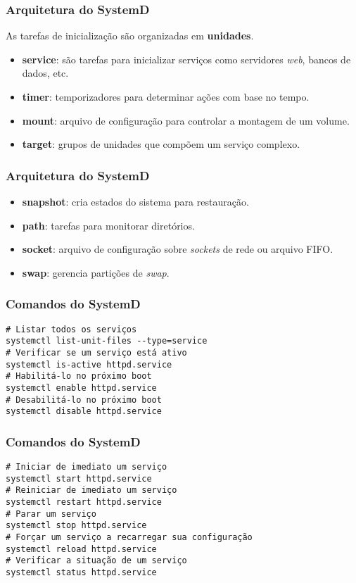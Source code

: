 \documentclass{beamer}
\begin{document}
   \begin{frame}
      \frametitle{Arquitetura do SystemD}
      As tarefas de inicialização são organizadas em \textbf{unidades}.
      \begin{itemize}
         \item \textbf{service}: são tarefas para inicializar serviços como servidores \textit{web}, bancos de dados, etc.	      
         \item \textbf{timer}: temporizadores para determinar ações com base no tempo.
         \item \textbf{mount}: arquivo de configuração para controlar a montagem de um volume.
         \item \textbf{target}: grupos de unidades que compõem um serviço complexo.
      \end{itemize}
   \end{frame}

   \begin{frame}
      \frametitle{Arquitetura do SystemD}
      \begin{itemize}
         \item \textbf{snapshot}: cria estados do sistema para restauração.	      
         \item \textbf{path}: tarefas para monitorar diretórios.
	 \item \textbf{socket}: arquivo de configuração sobre \textit{sockets} de rede ou arquivo FIFO.
	 \item \textbf{swap}: gerencia partições de \textit{swap}.
      \end{itemize}
   \end{frame}

   \begin{frame}[fragile]
      \frametitle{Comandos do SystemD}
      \begin{verbatim}
# Listar todos os serviços
systemctl list-unit-files --type=service
# Verificar se um serviço está ativo
systemctl is-active httpd.service
# Habilitá-lo no próximo boot
systemctl enable httpd.service
# Desabilitá-lo no próximo boot
systemctl disable httpd.service
      \end{verbatim}
\end{frame}

   \begin{frame}[fragile]
      \frametitle{Comandos do SystemD}
      \begin{verbatim}
# Iniciar de imediato um serviço
systemctl start httpd.service
# Reiniciar de imediato um serviço
systemctl restart httpd.service
# Parar um serviço
systemctl stop httpd.service
# Forçar um serviço a recarregar sua configuração
systemctl reload httpd.service
# Verificar a situação de um serviço
systemctl status httpd.service
      \end{verbatim}
\end{frame}
\end{document}
